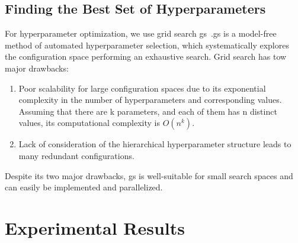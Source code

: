 \subsection{Finding the Best Set of Hyperparameters}
\label{sec:implement:setup: gridsearch}
For hyperparameter optimization, we use grid search \ac{gs}~\cite{Lorenzo2017,Yang2020,Zoeller2021}.\Ac{gs} is a model-free method of automated hyperparameter selection, which systematically explores the configuration space performing an exhaustive search.
Grid search has tow major drawbacks:
\begin{enumerate}
    \item Poor scalability for large configuration spaces due to its exponential complexity in the number of hyperparameters and corresponding values. Assuming that there are k parameters, and each of them has n distinct values, its computational complexity is $O(n^{k})$.
    \item Lack of consideration of the hierarchical hyperparameter structure leads to many redundant configurations.
\end{enumerate}
Despite its two major drawbacks, \ac{gs} is well-suitable for small search spaces and can easily be implemented and parallelized.

\section{Experimental Results}
\label{sec:eval:results}

